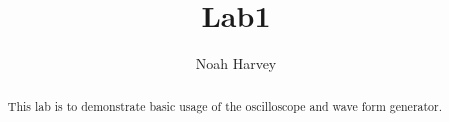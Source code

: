 \documentclass[a4paper,titlepage]{IEEEtran}
\begin{document}
\title{Lab1}
\author{Noah Harvey}
\maketitle

\begin{abstract}
This lab is to demonstrate basic usage of the oscilloscope and wave form
generator.	
\end{abstract}


\end{document}
